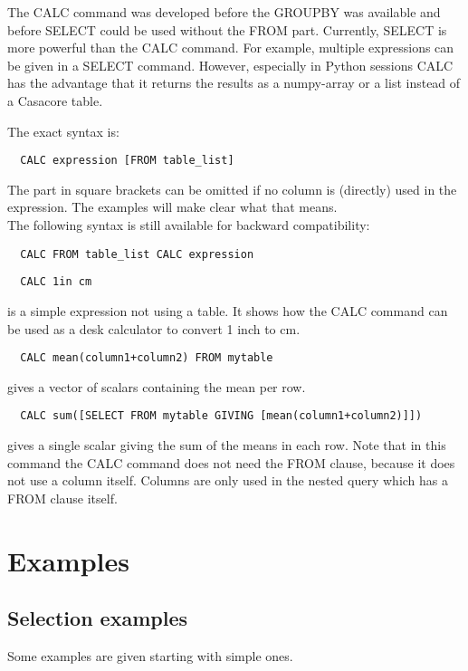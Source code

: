 The CALC command was developed before the GROUPBY was available and
before SELECT could be used without the FROM part. Currently,
SELECT is more powerful than the CALC command. For example,
multiple expressions can be given in a SELECT command. However,
especially in Python sessions CALC has the advantage that it returns
the results as a numpy-array or a list instead of a Casacore table.

The exact syntax is:
\begin{verbatim}
  CALC expression [FROM table_list]
\end{verbatim}
The part in square brackets can be omitted if no column is (directly)
used in the expression. The examples will make clear what that means.
\\The following syntax is still available for backward compatibility:
\begin{verbatim}
  CALC FROM table_list CALC expression
\end{verbatim}

\begin{verbatim}
  CALC 1in cm
\end{verbatim}
is a simple expression not using a table. It shows how the CALC
command can be used as a desk calculator to convert 1 inch to cm.

\begin{verbatim}
  CALC mean(column1+column2) FROM mytable
\end{verbatim}
gives a vector of scalars containing the mean per row.

\begin{verbatim}
  CALC sum([SELECT FROM mytable GIVING [mean(column1+column2)]])
\end{verbatim}
gives a single scalar giving the sum of the means in each row.
Note that in this command the CALC command does not need the FROM
clause, because it does not use a column itself. Columns are only
used in the nested query which has a FROM clause itself.

\section{Examples}
\subsection{\label{TAQL:SELEXAMPLES}Selection examples}
Some examples are given starting with simple ones.
